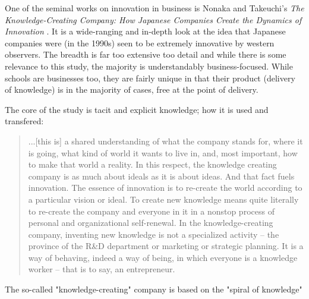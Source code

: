 One of the seminal works on innovation in business is Nonaka and Takeuchi's \textit{The Knowledge-Creating Company: How Japanese Companies Create the Dynamics of Innovation} \cite{nonaka1995knowledge}. It is a wide-ranging and in-depth look at the idea that Japanese companies were (in the 1990s) seen to be extremely innovative by western observers. The breadth is far too extensive too detail and while there is some relevance to this study, the majority is understandably business-focused. While schools are businesses too, they are fairly unique in that their product (delivery of knowledge) is in the majority of cases, free at the point of delivery.

The core of the study is tacit and explicit knowledge; how it is used and transfered:

\begin{quote}
...[this is] a shared understanding of what the company stands for, where it is going, what kind of world it wants to live in, and, most important, how to make that world a reality. In this respect, the knowledge creating company is as much about ideals as it is about ideas. And that fact fuels innovation. The essence of innovation is to re-create the world according to a particular vision or ideal. To create new knowledge means quite literally to re-create the company and everyone in it in a nonstop process of personal and organizational self-renewal. In the knowledge-creating company, inventing new knowledge is not a specialized activity – the province of the R&D department or marketing or strategic planning. It is a way of behaving, indeed a way of being, in which everyone is a knowledge worker – that is to say, an entrepreneur.
\end{quote}

The so-called "knowledge-creating" company is based on the "spiral of knowledge"




\cite{StopI4:online}